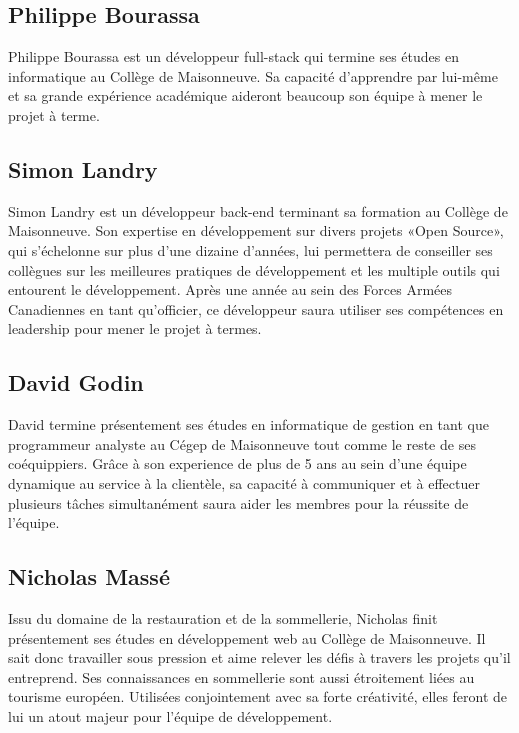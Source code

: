 \documentclass{scrreprt}
\begin{document}
\subsection{Philippe Bourassa}

Philippe Bourassa est un développeur full-stack qui termine ses études en
informatique au Collège de Maisonneuve. Sa capacité d'apprendre par lui-même et
sa grande expérience académique aideront beaucoup son équipe à mener le projet à
terme.


\subsection{Simon Landry}

Simon Landry est un développeur back-end terminant sa formation au Collège de
Maisonneuve. Son expertise en développement sur divers projets «Open Source»,
qui s'échelonne sur plus d'une dizaine d'années, lui permettera de conseiller
ses collègues sur les meilleures pratiques de développement et les multiple
outils qui entourent le développement. Après une année au sein des
Forces Armées Canadiennes en tant qu'officier, ce développeur saura utiliser ses
compétences en leadership pour mener le projet à termes.

\subsection{David Godin}

David termine présentement ses études en informatique de gestion en tant que
programmeur analyste au Cégep de Maisonneuve tout comme le reste de ses
coéquippiers. Grâce à son experience de plus de 5 ans au sein d'une équipe
dynamique au service à la clientèle, sa capacité à communiquer et à effectuer
plusieurs tâches simultanément saura aider les membres pour la réussite de
l'équipe.

\subsection{Nicholas Massé}

Issu du domaine de la restauration et de la sommellerie, Nicholas finit
présentement ses études en développement web au Collège de Maisonneuve.
Il sait donc travailler sous pression et aime relever les défis à travers les
projets qu'il entreprend. Ses connaissances en sommellerie sont aussi
étroitement liées au tourisme européen. Utilisées conjointement avec sa forte
créativité, elles feront de lui un atout majeur pour l'équipe de développement.
\end{document}
